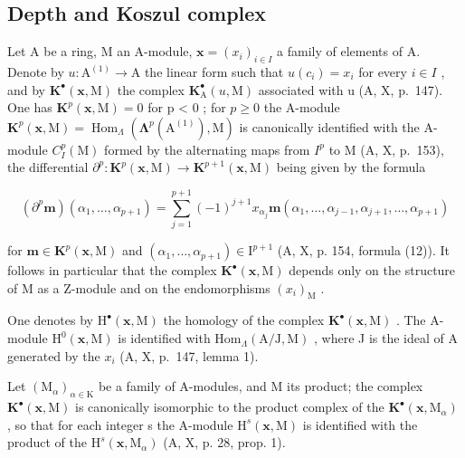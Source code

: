 \subsection{Depth and Koszul complex}

Let A be a ring, M an A-module, \(\mathbf{x} = (x_i)_{i \in I}\) a family of elements of A. Denote by \(u : \mathrm{A}^{(1)} \to \mathrm{A}\) the linear form such that \(u(c_i) = x_i\) for every \(i \in I\) , and by \(\mathbf{K}^{\bullet}(\mathbf{x}, \mathrm{M})\) the complex \(\mathbf{K}_{\mathrm{A}}^{\bullet}(u, \mathrm{M})\) associated with u (A, X, p.~147). One has \(\mathbf{K}^p(\mathbf{x}, \mathrm{M}) = 0\) for p \textless{} 0 ; for \(p \geqslant 0\) the A-module \(\mathbf{K}^p(\mathbf{x}, \mathrm{M}) = \operatorname{Hom}_{\Lambda} (\boldsymbol{\Lambda}^p(\mathrm{A}^{(1)}), \mathrm{M})\) is canonically identified with the A-module \(C_I^p(\mathrm{M})\) formed by the alternating maps from \(I^p\) to M (A, X, p.~153), the differential \(\partial^p : \mathbf{K}^p(\mathbf{x}, \mathrm{M}) \longrightarrow \mathbf{K}^{p+1}(\mathbf{x}, \mathrm{M})\) being given by the formula

\[
\left(\partial^ {p} \boldsymbol {m}\right) \left(\alpha_ {1}, \dots , \alpha_ {p + 1}\right) = \sum_ {j = 1} ^ {p + 1} (- 1) ^ {j + 1} x _ {\alpha_ {j}} \boldsymbol {m} \left(\alpha_ {1}, \dots , \alpha_ {j - 1}, \alpha_ {j + 1}, \dots , \alpha_ {p + 1}\right)
\]

for \(\boldsymbol{m} \in \mathbf{K}^{p}(\mathbf{x}, \mathrm{M})\) and \((\alpha_{1}, \ldots, \alpha_{p+1}) \in \mathrm{I}^{p+1}\) (A, X, p. 154, formula (12)). It follows in particular that the complex \(\mathbf{K}^{\bullet}(\mathbf{x}, \mathrm{M})\) depends only on the structure of M as a Z-module and on the endomorphisms \((x_{i})_{\mathrm{M}}\) .

One denotes by \(\mathrm{H}^{\bullet}(\mathbf{x},\mathrm{M})\) the homology of the complex \(\mathbf{K}^{\bullet}(\mathbf{x},\mathrm{M})\) . The A-module \(\mathrm{H}^{0}(\mathbf{x},\mathrm{M})\) is identified with \(\mathrm{Hom}_{\Lambda}(\mathrm{A}/\mathrm{J},\mathrm{M})\) , where J is the ideal of A generated by the \(x_{i}\) (A, X, p.~147, lemma 1).

Let \((\mathrm{M}_{\alpha})_{\alpha\in\mathrm{K}}\) be a family of A-modules, and M its product; the complex \(\mathbf{K}^{\bullet}(\mathbf{x},\mathrm{M})\) is canonically isomorphic to the product complex of the \(\mathbf{K}^{\bullet}(\mathbf{x},\mathrm{M}_{\alpha})\) , so that for each integer s the A-module \(\mathrm{H}^{s}(\mathbf{x},\mathrm{M})\) is identified with the product of the \(\mathrm{H}^{s}(\mathbf{x},\mathrm{M}_{\alpha})\) (A, X, p. 28, prop. 1).

